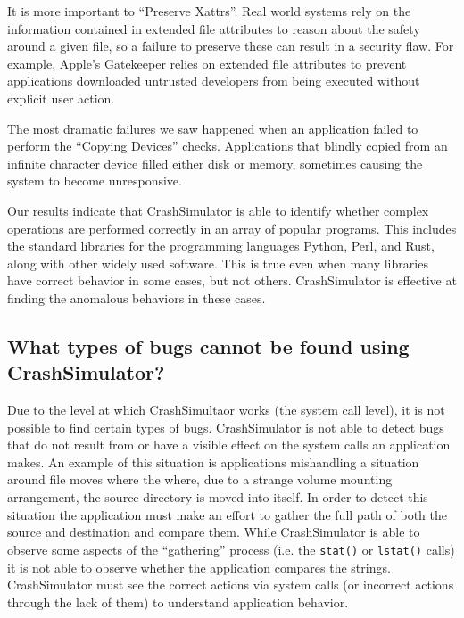 It is more important to ``Preserve Xattrs''.  Real world systems rely on the
information contained in extended file attributes to reason about the safety
around a given file, so a failure to preserve these can result in a
security flaw.  For example, Apple's Gatekeeper relies on extended file
attributes to prevent applications downloaded untrusted developers from being
executed without explicit user action. \cite{AppleCodesigning}



The most dramatic failures we saw happened when an application failed to 
perform the ``Copying Devices'' checks.  Applications that blindly copied 
from an infinite character device filled either disk or memory, sometimes
causing the system to become unresponsive.

Our results indicate that CrashSimulator is able to identify whether complex
operations are performed correctly in an array of popular programs.  
This includes the standard libraries for the programming languages Python,
Perl, and Rust, along with other widely used software.  This is true even
when many libraries have correct behavior in some cases, but not others.
CrashSimulator is effective at finding the anomalous behaviors in these
cases.

\subsection{What types of bugs cannot be found using CrashSimulator?}
\label{sec-not-found}

Due to the level at which CrashSimultaor works (the system call level), it is
not possible to find certain types of bugs.  CrashSimulator is not able to
detect bugs that do not result from or have a visible effect on the system calls
an application makes.  An example of this situation 
is applications mishandling a situation around file moves where the
where, due to a strange volume mounting arrangement, the source directory is
moved into itself.  In order to detect this situation the application must make
an effort to gather the full path of both the source and destination and compare
them.  While CrashSimulator is able to observe some aspects of the ``gathering''
process (i.e. the {\tt stat()} or {\tt lstat()} calls) it is not able to observe
whether the application compares the strings.  
CrashSimulator must see the correct actions via system calls (or incorrect
actions through the lack of them) to understand application behavior.

